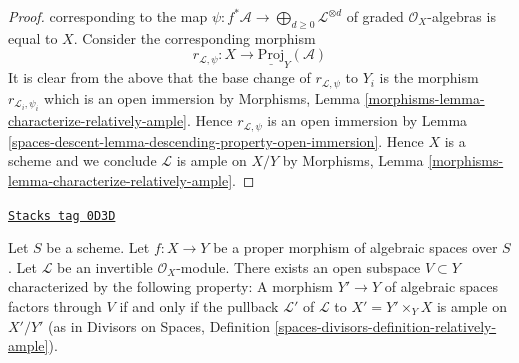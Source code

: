 \begin{proof}
corresponding to the map
$\psi : f^*\mathcal{A} \to \bigoplus_{d \geq 0} \mathcal{L}^{\otimes d}$
of graded $\mathcal{O}_X$-algebras
is equal to $X$. Consider the corresponding morphism
$$
r_{\mathcal{L}, \psi} : X \longrightarrow \underline{\text{Proj}}_Y(\mathcal{A})
$$
It is clear from the above that the base change of
$r_{\mathcal{L}, \psi}$ to $Y_i$ is the morphism
$r_{\mathcal{L}_i, \psi_i}$ which is an open immersion by
Morphisms, Lemma \ref{morphisms-lemma-characterize-relatively-ample}.
Hence $r_{\mathcal{L}, \psi}$ is an open immersion
by Lemma \ref{spaces-descent-lemma-descending-property-open-immersion}.
Hence $X$ is a scheme
and we conclude $\mathcal{L}$ is ample on $X/Y$ by
Morphisms, Lemma \ref{morphisms-lemma-characterize-relatively-ample}.
\end{proof}

\begin{lemma}
\label{spaces-descent-lemma-ample-in-neighbourhood}
\href{https://stacks.math.columbia.edu/tag/0D3D}{\texttt{Stacks tag 0D3D}}

Let $S$ be a scheme.
Let $f : X \to Y$ be a proper morphism of algebraic spaces over $S$.
Let $\mathcal{L}$ be an invertible $\mathcal{O}_X$-module.
There exists an open subspace $V \subset Y$ characterized by
the following property:
A morphism $Y' \to Y$ of algebraic spaces factors
through $V$ if and only if the pullback $\mathcal{L}'$
of $\mathcal{L}$ to $X' = Y' \times_Y X$ is ample on $X'/Y'$
(as in Divisors on Spaces, Definition
\ref{spaces-divisors-definition-relatively-ample}).
\end{lemma}

